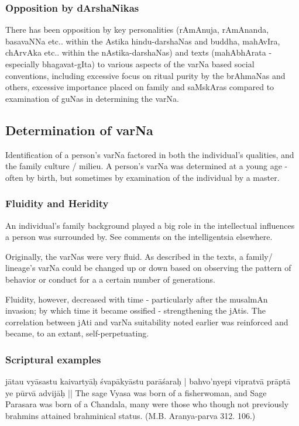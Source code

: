\documentclass[oneside, article]{memoir}
\begin{document}
\subsubsection{Opposition by dArshaNikas}
There has been opposition by key personalities (rAmAnuja, rAmAnanda, basavaNNa etc.. within the Astika hindu-darshaNas and buddha, mahAvIra, chArvAka etc.. within the nAstika-darshaNas) and texts (mahAbhArata -especially bhagavat-gIta) to various aspects of the varNa based social conventions, including excessive focus on ritual purity by the brAhmaNas and others, excessive importance placed on family and saMskAras compared to examination of guNas in determining the varNa.

\subsection{Determination of varNa}
Identification of a person's varNa factored in both the individual's qualities, and the family culture / milieu. A person's varNa was determined at a young age - often by birth, but sometimes by examination of the individual by a master.

\subsubsection{Fluidity and Heridity}
An individual's family background played a big role in the intellectual influences a person was surrounded by. See comments on the intelligentsia elsewhere.

Originally, the varNas were very fluid. As described in the texts, a family/ lineage's varNa could be changed up or down based on observing the pattern of behavior or conduct for a a certain number of generations.

Fluidity, however, decreased with time - particularly after the musalmAn invasion; by which time it became ossified - strengthening the jAtis. The correlation between jAti and varNa suitability noted earlier was reinforced and became, to an extant, self-perpetuating.

\subsubsection{Scriptural examples}
jātau vyāsastu kaivartyāḥ śvapākyāstu parāśaraḥ |
bahvo'nyepi vipratvā prāptā ye pūrvā advijāḥ ||
The sage Vyasa was born of a fisherwoman, and Sage Parasara was born of a Chandala, many were those who though not previously brahmins attained brahminical status. (M.B. Aranya-parva 312. 106.)
\end{document}
